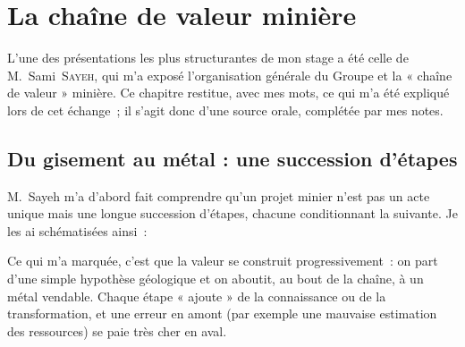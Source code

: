 \documentclass[12pt,a4paper,oneside]{report}
\begin{document}
\chapter{La chaîne de valeur minière}
\label{chap:chaine}

L'une des présentations les plus structurantes de mon stage a été celle de M.~Sami~\textsc{Sayeh}, qui m'a exposé l'organisation générale du Groupe et la « chaîne de valeur » minière. Ce chapitre restitue, avec mes mots, ce qui m'a été expliqué lors de cet échange~; il s'agit donc d'une source orale, complétée par mes notes.

\section{Du gisement au métal : une succession d'étapes}

M.~Sayeh m'a d'abord fait comprendre qu'un projet minier n'est pas un acte unique mais une longue succession d'étapes, chacune conditionnant la suivante. Je les ai schématisées ainsi~:

\begin{center}
\label{fig:chaine}
\end{center}

Ce qui m'a marquée, c'est que la valeur se construit progressivement~: on part d'une simple hypothèse géologique et on aboutit, au bout de la chaîne, à un métal vendable. Chaque étape « ajoute » de la connaissance ou de la transformation, et une erreur en amont (par exemple une mauvaise estimation des ressources) se paie très cher en aval.
\end{document}
